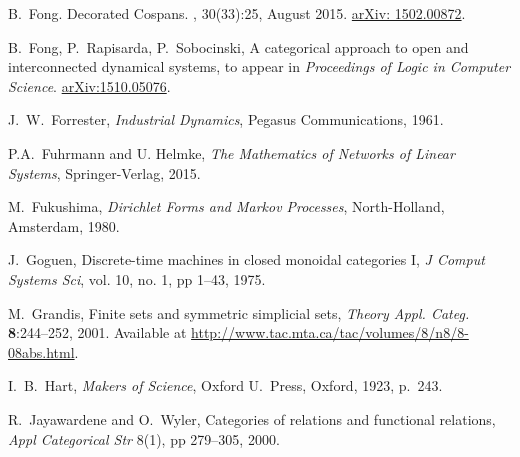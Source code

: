 \begin{thebibliography}{RSW00}
    B.\ Fong.
    \newblock Decorated Cospans.
    , 30(33):25, August 2015.
    \newblock \href{http://arxiv.org/abs/1502.00872}{arXiv: 1502.00872}.

     B.\ Fong, P.\ Rapisarda, P.\
    Sobocinski, A categorical approach to open and interconnected dynamical
    systems, to appear in {\sl Proceedings of Logic in Computer Science}.
    \href{http://arxiv.org/abs/1510.05076}{arXiv:1510.05076}.

     J.\ W.\ Forrester, {\sl Industrial Dynamics}, Pegasus
    Communications, 1961. 


     P.A.~Fuhrmann and U. Helmke, \emph{The Mathematics of Networks of Linear Systems}, Springer-Verlag, 2015. 

     M.\ Fukushima, {\sl Dirichlet Forms and Markov Processes},
    North-Holland, Amsterdam, 1980.

     J.\ Goguen, Discrete-time machines in closed monoidal categories
    I, \emph{J Comput Systems Sci}, vol. 10, no. 1, pp 1--43,
    1975. 

     M.\ Grandis, Finite sets and symmetric simplicial sets,
    \textsl{Theory Appl. Categ.} {\bf 8}:244--252, 2001. Available at
    \href{http://www.tac.mta.ca/tac/volumes/8/n8/8-08abs.html}
    {http://www.tac.mta.ca/tac/volumes/8/n8/8-08abs.html}.


     I.\ B.\ Hart, {\sl Makers of Science}, Oxford U.\ Press,
    Oxford, 1923, p.\ 243.


     R.\ Jayawardene and O.\ Wyler, Categories of relations and
    functional relations, \emph{Appl Categorical Str} 8(1),
    pp 279--305, 2000.



\end{thebibliography}
